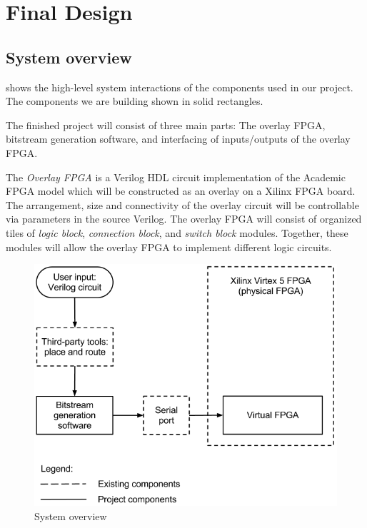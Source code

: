 \section{Final Design}


\subsection{System overview}
\label{system-overview}

 shows the high-level system interactions of the components used in our project.
The components we are building shown in solid rectangles.

The finished project will consist of three main parts: The overlay FPGA, bitstream generation software, and interfacing of inputs/outputs of the overlay FPGA.

The \emph{Overlay FPGA} is a Verilog HDL circuit implementation of the Academic FPGA model which will be constructed as an overlay on a Xilinx FPGA board.
The arrangement, size and connectivity of the overlay circuit will be controllable via parameters in the source Verilog.
The overlay FPGA will consist of organized tiles of \emph{logic block}, \emph{connection block}, and \emph{switch block} modules.
Together, these modules will allow the overlay FPGA to implement different logic circuits.

\begin{figure}[!h]
	\centering
	\includegraphics[scale=0.6]{system.png}
	\caption{System overview}
	\label{system-diagram}
\end{figure}

